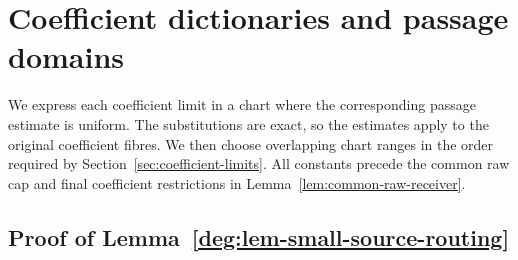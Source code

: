 \section{Coefficient dictionaries and passage domains}
\label{app:coefficient-dictionaries}

We express each coefficient limit in a chart where the corresponding
passage estimate is uniform. The substitutions are exact, so the estimates
apply to the original coefficient fibres. We then choose overlapping
chart ranges in the order required by Section~\ref{sec:coefficient-limits}.
All constants precede the common raw cap and final coefficient
restrictions in Lemma~\ref{lem:common-raw-receiver}.

\subsection{Proof of Lemma~\ref{deg:lem-small-source-routing}}
\label{app:proof-small-source-routing}

